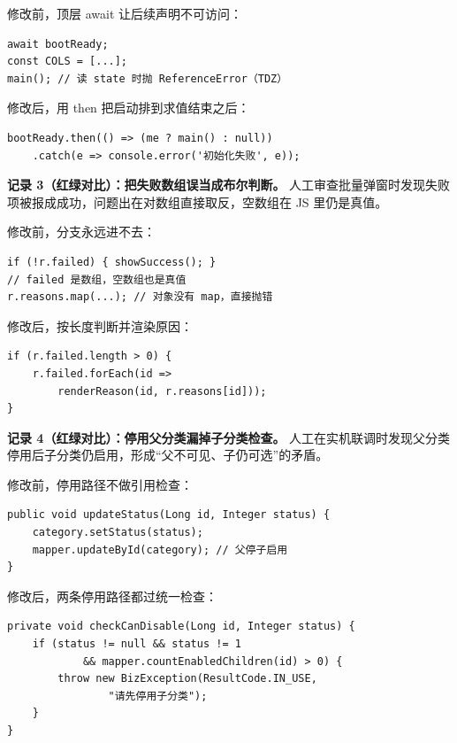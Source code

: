 \documentclass[zihao=-4,UTF8,openany]{ctexart}
\renewcommand{\_}{\textunderscore\allowbreak}
\begin{document}
修改前，顶层 await 让后续声明不可访问：

\begin{lstlisting}[style=fixBefore]
await bootReady;
const COLS = [...];
main(); // 读 state 时抛 ReferenceError（TDZ）
\end{lstlisting}

修改后，用 then 把启动排到求值结束之后：

\begin{lstlisting}[style=fixAfter]
bootReady.then(() => (me ? main() : null))
    .catch(e => console.error('初始化失败', e));
\end{lstlisting}

\noindent\textbf{记录 3（红绿对比）：把失败数组误当成布尔判断。} 人工审查批量弹窗时发现失败项被报成成功，问题出在对数组直接取反，空数组在 JS 里仍是真值。

修改前，分支永远进不去：

\begin{lstlisting}[style=fixBefore]
if (!r.failed) { showSuccess(); }
// failed 是数组，空数组也是真值
r.reasons.map(...); // 对象没有 map，直接抛错
\end{lstlisting}

修改后，按长度判断并渲染原因：

\begin{lstlisting}[style=fixAfter]
if (r.failed.length > 0) {
    r.failed.forEach(id =>
        renderReason(id, r.reasons[id]));
}
\end{lstlisting}

\noindent\textbf{记录 4（红绿对比）：停用父分类漏掉子分类检查。} 人工在实机联调时发现父分类停用后子分类仍启用，形成“父不可见、子仍可选”的矛盾。

修改前，停用路径不做引用检查：

\begin{lstlisting}[style=fixBefore]
public void updateStatus(Long id, Integer status) {
    category.setStatus(status);
    mapper.updateById(category); // 父停子启用
}
\end{lstlisting}

修改后，两条停用路径都过统一检查：

\begin{lstlisting}[style=fixAfter]
private void checkCanDisable(Long id, Integer status) {
    if (status != null && status != 1
            && mapper.countEnabledChildren(id) > 0) {
        throw new BizException(ResultCode.IN_USE,
                "请先停用子分类");
    }
}
\end{lstlisting}
\end{document}

